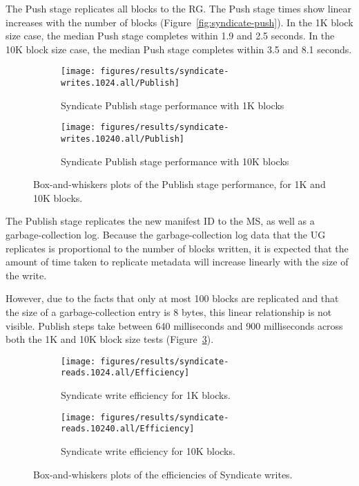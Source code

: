 The Push stage replicates all blocks to the RG.  The Push stage times show linear
increases with the number of blocks (Figure~\ref{fig:syndicate-push}).
In the 1K block size case, the median Push stage
completes within 1.9 and 2.5 seconds.  In the 10K block size case, the median
Push stage completes within 3.5 and 8.1 seconds.

\begin{figure}[htp!]
   \centering
   \begin{subfigure}[b]{.8\textwidth}
      \texttt{[image: figures/results/syndicate-writes.1024.all/Publish]}
      \label{fig:syndicate-publish-1k}
      \caption{Syndicate Publish stage performance with 1K blocks}
   \end{subfigure}
   \begin{subfigure}[b]{.8\textwidth}
      \texttt{[image: figures/results/syndicate-writes.10240.all/Publish]}
      \label{fig:syndicate-publish-10k}
      \caption{Syndicate Publish stage performance with 10K blocks}
   \end{subfigure}
   \caption{Box-and-whiskers plots of the Publish stage performance, for 1K and
   10K blocks.}
   \label{fig:syndicate-publish}
\end{figure}

The Publish stage replicates the new manifest ID to the MS, as well as a
garbage-collection log.  Because the garbage-collection log data that the UG
replicates is proportional to the number of blocks written, it is expected that
the amount of time taken to replicate metadata will increase linearly with the
size of the write.

However, due to the facts that only at most 100 blocks are replicated and that
the size of a garbage-collection entry is 8 bytes, this linear relationship is
not visible.  Publish steps take between 640 milliseconds and 900 milliseconds
across both the 1K and 10K block size tests
(Figure~\ref{fig:syndicate-publish}).

\begin{figure}[htp!]
   \centering
   \begin{subfigure}[b]{.8\textwidth}
      \texttt{[image: figures/results/syndicate-reads.1024.all/Efficiency]}
      \label{fig:syndicate-efficiency-1k}
      \caption{Syndicate write efficiency for 1K blocks.}
   \end{subfigure}
   \begin{subfigure}[b]{.8\textwidth}
      \texttt{[image: figures/results/syndicate-reads.10240.all/Efficiency]}
      \label{fig:syndicate-efficiency-1k}
      \caption{Syndicate write efficiency for 10K blocks.}
   \end{subfigure}
   \caption{Box-and-whiskers plots of the efficiencies of Syndicate
   writes.}
   \label{fig:syndicate-write-efficiency}
\end{figure}

